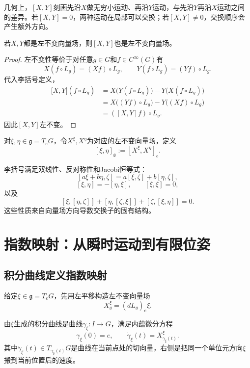几何上，$[X,Y]$刻画先沿$X$做无穷小运动、再沿$Y$运动，与先沿$Y$再沿$X$运动之间的差异。若$[X,Y]=0$，两种运动在局部可以交换；若$[X,Y]\neq0$，交换顺序会产生额外方向。

\begin{proposition}[左不变向量场对李括号封闭]
若$X,Y$都是左不变向量场，则$[X,Y]$也是左不变向量场。
\end{proposition}

\begin{proof}
左不变性等价于对任意$g\in G$和$f\in C^\infty(G)$有
\[
    X(f\circ L_g)=(Xf)\circ L_g,
    \qquad
    Y(f\circ L_g)=(Yf)\circ L_g.
\]
代入李括号定义，
\[
\begin{aligned}
    \bigl[X,Y\bigr](f\circ L_g)
    &=X\bigl(Y(f\circ L_g)\bigr)-Y\bigl(X(f\circ L_g)\bigr)\\
    &=X\bigl((Yf)\circ L_g\bigr)-Y\bigl((Xf)\circ L_g\bigr)\\
    &=([X,Y]f)\circ L_g.
\end{aligned}
\]
因此$[X,Y]$左不变。
\end{proof}

\begin{definition}[李代数层面的李括号]
对$\xi,\eta\in\mathfrak g=T_eG$，令$X^\xi,X^\eta$为对应的左不变向量场，定义
\[
    [\xi,\eta]_{\mathfrak g}:=[X^\xi,X^\eta]_e.
\]
\end{definition}

\begin{theorem}[李代数公理]
李括号满足双线性、反对称性和Jacobi恒等式：
\[
    [a\xi+b\eta,\zeta]
    =a[\xi,\zeta]+b[\eta,\zeta],
\]
\[
    [\xi,\eta]=-[\eta,\xi],
    \qquad
    [\xi,\xi]=0,
\]
以及
\[
    [\xi,[\eta,\zeta]]
    +[\eta,[\zeta,\xi]]
    +[\zeta,[\xi,\eta]]=0.
\]
这些性质来自向量场方向导数交换子的固有结构。
\end{theorem}


\section{指数映射：从瞬时运动到有限位姿}

\subsection{积分曲线定义指数映射}

给定$\xi\in\mathfrak g=T_eG$，先用左平移构造左不变向量场
\[
    X^\xi_g=(dL_g)_e\xi.
\]

\begin{definition}[积分曲线]
由$\xi$生成的积分曲线是曲线$\gamma_\xi:I\to G$，满足内蕴微分方程
\[
    \gamma_\xi(0)=e,
    \qquad
    \dot\gamma_\xi(t)=X^\xi_{\gamma_\xi(t)}.
\]
其中$\dot\gamma_\xi(t)\in T_{\gamma_\xi(t)}G$是曲线在当前点处的切向量，右侧是把同一个单位元方向$\xi$搬到当前位置后的速度。
\end{definition}

